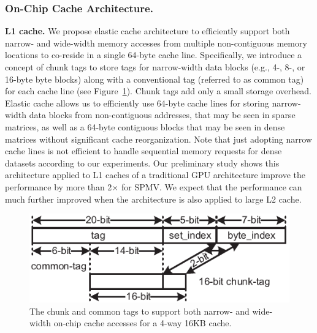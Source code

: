 

\subsubsection{On-Chip Cache Architecture.} 
\label{sec:memory:on-chip}
\noindent
\textbf{L1 cache.}
We propose elastic cache architecture to efficiently support both narrow- and wide-width memory accesses from multiple non-contiguous memory locations to co-reside in a single 64-byte cache line. 
Specifically, we introduce a concept of chunk tags to store tags for narrow-width data blocks (e.g., 4-, 8-, or 16-byte byte blocks) along with a conventional tag (referred to as common tag) for each cache line (see Figure~\ref{fig:elastic-cache}). 
Chunk tags add only a small storage overhead. Elastic cache allows us to efficiently use 64-byte cache lines for storing narrow-width data blocks from non-contiguous addresses, that may be seen in sparse matrices, as well as a 64-byte contiguous  blocks that may be seen in dense matrices without significant cache reorganization. 
Note that just adopting narrow cache lines is not efficient to handle sequential memory requests for dense datasets according to our experiments.
Our preliminary study shows this architecture applied to L1 caches of a traditional GPU architecture improve the performance by more than 2$\times$ for SPMV.
We expect that the performance can much further improved when the architecture is also applied to large L2 cache.



\begin{figure}
\center
\includegraphics[width=1.0\linewidth]{./fig/chunk_tag_16bit-eps-converted-to.pdf}
\caption{The chunk and common tags to support both narrow- and wide-width on-chip cache accesses for a 4-way 16KB cache.}
\label{fig:elastic-cache}
\end{figure}

